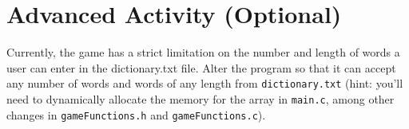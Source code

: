 \documentclass[12pt]{scrartcl}
\begin{document}
\section{Advanced Activity (Optional)}

Currently, the game has a strict limitation on the number and length of 
words a user can enter in the dictionary.txt file.  Alter the program so 
that it can accept any number of words and words of any length from 
\texttt{dictionary.txt} (hint: you'll need to dynamically allocate 
the memory for the array in \texttt{main.c}, among other 
changes in \texttt{gameFunctions.h} and \texttt{gameFunctions.c}).  
\end{document}
